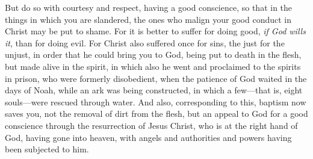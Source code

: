 \begin{biblechapter}
\verse But do so with courtesy and respect, having a good conscience, so that in the things in which you are slandered, the ones who malign your good conduct in Christ may be put to shame.
\verse For it is better to suffer for doing good, \textit{if God wills it}, than for doing evil.
\verse For Christ also suffered once for sins, 
the just for the unjust, 
in order that he could bring you to God, 
being put to death in the flesh, 
but made alive in the spirit,
\verse in which also he went and proclaimed to the spirits in prison,
\verse who were formerly disobedient, when the patience of God waited in the days of Noah, while an ark was being constructed, in which a few—that is, eight souls—were rescued through water.
\verse And also, corresponding to this, baptism now saves you, not the removal of dirt from the flesh, but an appeal to God for a good conscience through the resurrection of Jesus Christ,
\verse who is at the right hand of God, having gone into heaven, with angels and authorities and powers having been subjected to him.
\end{biblechapter}

